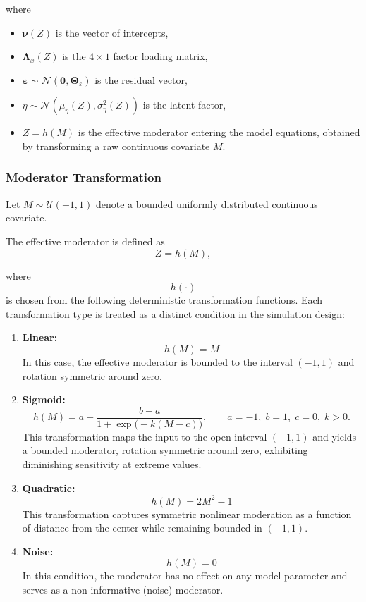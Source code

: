 \documentclass[
  man,
  floatsintext]{apa7}
\providecommand{\tightlist}{%
  \setlength{\itemsep}{0pt}\setlength{\parskip}{0pt}}
\begin{document}
where

\begin{itemize}
\tightlist
\item
  \(\boldsymbol{\nu}(Z)\) is the vector of intercepts,
\item
  \(\boldsymbol{\Lambda}_x(Z)\) is the \(4 \times 1\) factor loading
  matrix,
\item
  \(\boldsymbol{\varepsilon} \sim \mathcal{N}\!\left(\mathbf{0}, \boldsymbol{\Theta}_\varepsilon\right)\)
  is the residual vector,
\item
  \(\eta \sim \mathcal{N}\!\left(\mu_\eta(Z), \sigma^2_\eta(Z)\right)\)
  is the latent factor,
\item
  \(Z = h(M)\) is the effective moderator entering the model equations,
  obtained by transforming a raw continuous covariate \(M\).
\end{itemize}

\subsubsection{Moderator Transformation}\label{moderator-transformation}

Let \(M \sim \mathcal{U}(-1,1)\) denote a bounded uniformly distributed
continuous covariate.

The effective moderator is defined as \[
Z = h(M),
\]

where \[h(\cdot)\] is chosen from the following deterministic
transformation functions. Each transformation type is treated as a
distinct condition in the simulation design:

\begin{enumerate}
\def\labelenumi{\arabic{enumi}.}
\item
  \textbf{Linear:} \[
  h(M) = M
  \] In this case, the effective moderator is bounded to the interval
  \((-1,1)\) and rotation symmetric around zero.
\item
  \textbf{Sigmoid:} \[
  h(M) = a + \frac{b-a}{1 + \exp\!\bigl(-k(M-c)\bigr)},
  \qquad a=-1,\; b=1,\; c=0,\; k>0.
  \] This transformation maps the input to the open interval \((-1, 1)\)
  and yields a bounded moderator, rotation symmetric around zero,
  exhibiting diminishing sensitivity at extreme values.
\item
  \textbf{Quadratic:} \[
  h(M) = 2M^2 - 1
  \] This transformation captures symmetric nonlinear moderation as a
  function of distance from the center while remaining bounded in
  \((-1,1)\).
\item
  \textbf{Noise:} \[
  h(M) = 0
  \] In this condition, the moderator has no effect on any model
  parameter and serves as a non-informative (noise) moderator.
\end{enumerate}
\end{document}
